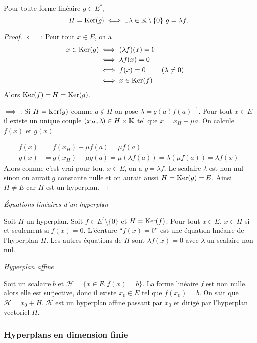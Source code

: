 \begin{prop}
  Pour toute forme linéaire $g \in E^*$,
  \begin{equation}
    H = \operatorname{Ker}(g) \iff \exists \lambda \in \mathbb{K}\setminus\{0\} \ g=\lambda f.
  \end{equation}
\end{prop}
\begin{proof}
  $\impliedby$ : Pour tout $x \in E$, on a
  \begin{align}
    x \in \operatorname{Ker}(g) &\iff (\lambda f)(x) = 0\\
    &\iff \lambda f(x) =0\\
    &\iff f(x) =0 && (\lambda \neq 0)\\
    &\iff x \in \operatorname{Ker}(f)
  \end{align}
  Alors $\operatorname{Ker}(f)=H=\operatorname{Ker}(g)$.

  $\implies$ : Si $H=\operatorname{Ker}(g)$ comme $a \notin H$ on pose $\lambda = g(a) f(a)^{-1}$. Pour tout $x \in E$ il existe un unique couple $(x_H, \lambda) \in H \times \mathbb{K}$ tel que $x=x_H +\mu a$. On calcule $f(x)$ et $g(x)$

  \begin{align}
    f(x) &= f(x_H)+\mu f(a) = \mu f(a) \\
    g(x) &= g(x_H) +\mu g(a) = \mu (\lambda f(a)) = \lambda (\mu f(a))=\lambda f(x)
  \end{align}
  Alors comme c'est vrai pour tout $x \in E$, on a $g=\lambda f$. Le scalaire $\lambda$ est non nul sinon on aurait $g$ constante nulle et on aurait aussi $H = \operatorname{Ker}(g)=E$. Ainsi $H \neq E$ car $H$ est un hyperplan.
\end{proof}

\emph{Équations linéaires d'un hyperplan}

Soit $H$ un hyperplan. Soit $f \in E^* \setminus\{0\}$ et $H=\operatorname{Ker}(f)$. Pour tout $x \in E$, $x \in H$ si et seulement si $f(x)=0$. L'écriture ``$f(x)=0$'' est une équation linéaire de l'hyperplan $H$. Les autres équations de $H$ sont $\lambda f(x)=0$ avec $\lambda$ un scalaire non nul.

\emph{Hyperplan affine}

Soit un scalaire $b$ et $\mathcal{H}=\{x \in E, f(x)=b\}$. La forme linéaire $f$ est non nulle, alors elle est surjective, donc il existe $x_0 \in E$ tel que $f(x_0)=b$. On sait que $\mathcal{H}=x_0 + H$. $\mathcal{H}$ est un hyperplan affine passant par $x_0$ et dirigé par l'hyperplan vectoriel $H$.

\subsubsection{Hyperplans en dimension finie}

